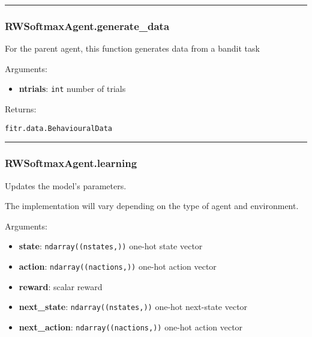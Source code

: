 \begin{center}\rule{0.5\linewidth}{\linethickness}\end{center}

\hypertarget{rwsoftmaxagent.generate_data}{%
\subsubsection{RWSoftmaxAgent.generate\_data}\label{rwsoftmaxagent.generate_data}}

\begin{Shaded}
\begin{Highlighting}[]
\end{Highlighting}
\end{Shaded}

For the parent agent, this function generates data from a bandit task

Arguments:

\begin{itemize}
\tightlist
\item
  \textbf{ntrials}: \texttt{int} number of trials
\end{itemize}

Returns:

\texttt{fitr.data.BehaviouralData}

\begin{center}\rule{0.5\linewidth}{\linethickness}\end{center}

\hypertarget{rwsoftmaxagent.learning}{%
\subsubsection{RWSoftmaxAgent.learning}\label{rwsoftmaxagent.learning}}

\begin{Shaded}
\begin{Highlighting}[]
\end{Highlighting}
\end{Shaded}

Updates the model's parameters.

The implementation will vary depending on the type of agent and
environment.

Arguments:

\begin{itemize}
\tightlist
\item
  \textbf{state}: \texttt{ndarray((nstates,))} one-hot state vector
\item
  \textbf{action}: \texttt{ndarray((nactions,))} one-hot action vector
\item
  \textbf{reward}: scalar reward
\item
  \textbf{next\_state}: \texttt{ndarray((nstates,))} one-hot next-state
  vector
\item
  \textbf{next\_action}: \texttt{ndarray((nactions,))} one-hot action
  vector
\end{itemize}

